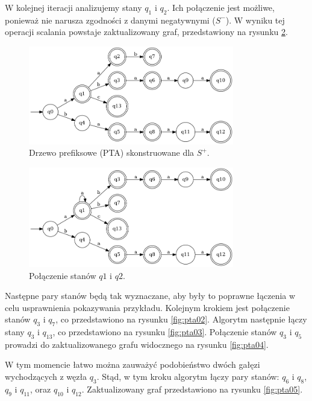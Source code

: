 W kolejnej iteracji analizujemy stany \( q_1 \) i \( q_2 \). Ich połączenie jest możliwe, ponieważ nie narusza zgodności z danymi negatywnymi (\( S^- \)). W wyniku tej operacji scalania powstaje zaktualizowany graf, przedstawiony na rysunku \ref{fig:pta01}.

\begin{figure}[ht]
    \centering
    \includegraphics[width=0.8\textwidth]{images/run_example/rpni/0.png}
    \caption{Drzewo prefiksowe (PTA) skonstruowane dla \( S^+ \).}
    \label{fig:pta00}
\end{figure}

\begin{figure}[ht]
    \centering
    \includegraphics[width=0.8\textwidth]{images/run_example/rpni/1.png}
    \caption{Połączenie stanów \( q1 \) i \( q2 \).}
    \label{fig:pta01}
\end{figure} 

Następne pary stanów będą tak wyznaczane, aby były to poprawne łączenia w celu usprawnienia pokazywania przykładu. Kolejnym krokiem jest połączenie stanów \( q_3 \) i \( q_7 \), co przedstawiono na rysunku \ref{fig:pta02}. Algorytm następnie łączy stany \( q_3 \) i \( q_{13} \), co przedstawiono na rysunku \ref{fig:pta03}. Połączenie stanów \( q_3 \) i \( q_5 \) prowadzi do zaktualizowanego grafu widocznego na rysunku \ref{fig:pta04}. 

W tym momencie łatwo można zauważyć podobieństwo dwóch gałęzi wychodzących z węzła \( q_3 \). Stąd, w tym kroku algorytm łączy pary stanów: \( q_6 \) i \( q_8 \), \( q_9 \) i \( q_{11} \), oraz \( q_{10} \) i \( q_{12} \). Zaktualizowany graf przedstawiono na rysunku \ref{fig:pta05}. 

